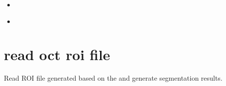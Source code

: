 \documentclass[letterpaper,10pt,english]{sphinxmanual}
\begin{document}
\begin{fulllineitems}

\begin{itemize}
\item {} 
{\hyperref[\detokenize{index:util.polar2cartesian.polar2cartesian_large_3d_file}]{}}

\item {} 
{\hyperref[\detokenize{index:util.read_oct_roi_file.read_oct_roi_file}]{}}

\end{itemize}



\end{fulllineitems}



\section{read oct roi file}
\label{\detokenize{index:module-util.read_oct_roi_file}}\label{\detokenize{index:read-oct-roi-file}}
Read ROI file generated based on the and generate segmentation results.
\end{document}
